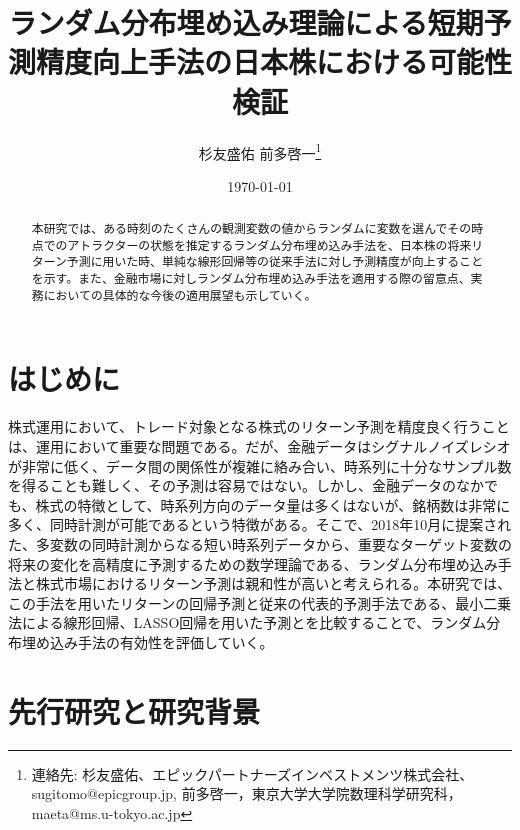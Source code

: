 \documentclass[JEL]{AEA}
\begin{document}
\title{\huge ランダム分布埋め込み理論による短期予測精度向上手法の日本株における可能性検証}
\author{杉友盛佑  前多啓一\thanks{%
連絡先: 杉友盛佑、エピックパートナーズインベストメンツ株式会社、 sugitomo@epicgroup.jp,
前多啓一，東京大学大学院数理科学研究科，maeta@ms.u-tokyo.ac.jp}}
\date{\today}
\JEL{}
\Keywords{}

\begin{abstract}
\footnotesize 本研究では、ある時刻のたくさんの観測変数の値からランダムに変数を選んでその時点でのアトラクターの状態を推定するランダム分布埋め込み手法を、日本株の将来リターン予測に用いた時、単純な線形回帰等の従来手法に対し予測精度が向上することを示す。また、金融市場に対しランダム分布埋め込み手法を適用する際の留意点、実務においての具体的な今後の適用展望も示していく。
\end{abstract}

\maketitle
\section{はじめに}
株式運用において、トレード対象となる株式のリターン予測を精度良く行うことは、運用において重要な問題である。だが、金融データはシグナルノイズレシオが非常に低く、データ間の関係性が複雑に絡み合い、時系列に十分なサンプル数を得ることも難しく、その予測は容易ではない。しかし、金融データのなかでも、株式の特徴として、時系列方向のデータ量は多くはないが、銘柄数は非常に多く、同時計測が可能であるという特徴がある。そこで、2018年10月に提案された、多変数の同時計測からなる短い時系列データから、重要なターゲット変数の将来の変化を高精度に予測するための数学理論である、ランダム分布埋め込み手法と株式市場におけるリターン予測は親和性が高いと考えられる。本研究では、この手法を用いたリターンの回帰予測と従来の代表的予測手法である、最小二乗法による線形回帰、LASSO回帰を用いた予測とを比較することで、ランダム分布埋め込み手法の有効性を評価していく。

\section{先行研究と研究背景}
\end{document}
